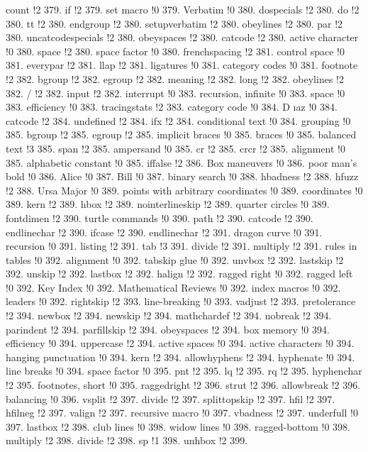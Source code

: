 count !2 379.
if !2 379.
set macro !0 379.
Verbatim !0 380.
dospecials !2 380.
do !2 380.
tt !2 380.
endgroup !2 380.
setupverbatim !2 380.
obeylines !2 380.
par !2 380.
uncatcodespecials !2 380.
obeyspaces !2 380.
catcode !2 380.
active character !0 380.
space !2 380.
space factor !0 380.
frenchspacing !2 381.
control space !0 381.
everypar !2 381.
llap !2 381.
ligatures !0 381.
category codes !0 381.
footnote !2 382.
bgroup !2 382.
egroup !2 382.
meaning !2 382.
long !2 382.
obeylines !2 382.
/ !2 382.
input !2 382.
interrupt !0 383.
recursion, infinite !0 383.
space !0 383.
efficiency !0 383.
tracingstats !2 383.
category code !0 384.
D{ \i }az !0 384.
catcode !2 384.
undefined !2 384.
ifx !2 384.
conditional text !0 384.
grouping !0 385.
bgroup !2 385.
egroup !2 385.
implicit braces !0 385.
braces !0 385.
balanced text !3 385.
span !2 385.
ampersand !0 385.
cr !2 385.
crcr !2 385.
alignment !0 385.
alphabetic constant !0 385.
iffalse !2 386.
Box maneuvers !0 386.
poor man's bold !0 386.
Alice !0 387.
Bill !0 387.
binary search !0 388.
hbadness !2 388.
hfuzz !2 388.
Ursa Major !0 389.
points with arbitrary coordinates !0 389.
coordinates !0 389.
kern !2 389.
hbox !2 389.
nointerlineskip !2 389.
quarter circles !0 389.
fontdimen !2 390.
turtle commands !0 390.
path !2 390.
catcode !2 390.
endlinechar !2 390.
ifcase !2 390.
endlinechar !2 391.
dragon curve !0 391.
recursion !0 391.
listing !2 391.
tab !3 391.
divide !2 391.
multiply !2 391.
rules in tables !0 392.
alignment !0 392.
tabskip glue !0 392.
unvbox !2 392.
lastskip !2 392.
unskip !2 392.
lastbox !2 392.
halign !2 392.
ragged right !0 392.
ragged left !0 392.
Key Index !0 392.
Mathematical Reviews !0 392.
index macros !0 392.
leaders !0 392.
rightskip !2 393.
line-breaking !0 393.
vadjust !2 393.
pretolerance !2 394.
newbox !2 394.
newskip !2 394.
mathchardef !2 394.
nobreak !2 394.
parindent !2 394.
parfillskip !2 394.
obeyspaces !2 394.
box memory !0 394.
efficiency !0 394.
uppercase !2 394.
active spaces !0 394.
active characters !0 394.
hanging punctuation !0 394.
kern !2 394.
allowhyphens !2 394.
hyphenate !0 394.
line breaks !0 394.
space factor !0 395.
pnt !2 395.
lq !2 395.
rq !2 395.
hyphenchar !2 395.
footnotes, short !0 395.
raggedright !2 396.
strut !2 396.
allowbreak !2 396.
balancing !0 396.
vsplit !2 397.
divide !2 397.
splittopskip !2 397.
hfil !2 397.
hfilneg !2 397.
valign !2 397.
recursive macro !0 397.
vbadness !2 397.
underfull !0 397.
lastbox !2 398.
club lines !0 398.
widow lines !0 398.
ragged-bottom !0 398.
multiply !2 398.
divide !2 398.
sp !1 398.
unhbox !2 399.
